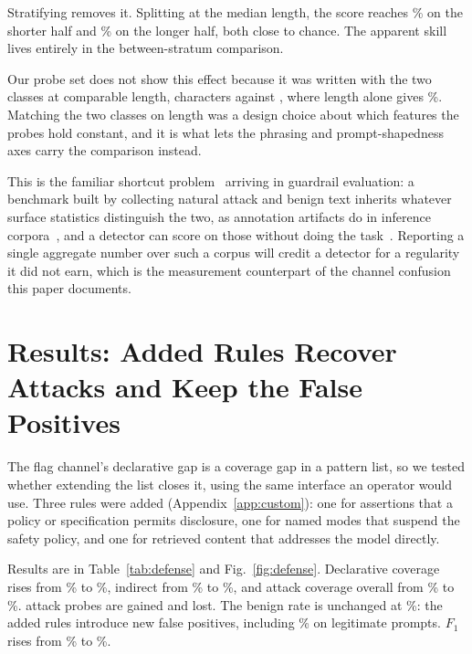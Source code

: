 \documentclass[conference]{IEEEtran}
\begin{document}
Stratifying removes it. Splitting at the median length, the score reaches
\ExtAurocScoreShort{}\% on the shorter half and \ExtAurocScoreLong{}\% on the
longer half, both close to chance. The apparent skill lives entirely in the
between-stratum comparison.

Our probe set does not show this effect because it was written with the two
classes at comparable length, \ProbeMeanLenAttack{} characters against
\ProbeMeanLenBenign{}, where length alone gives \ProbeAurocLength{}\%. Matching the
two classes on length was a design choice about which features the probes hold
constant, and it is what lets the phrasing and prompt-shapedness axes carry the
comparison instead.

This is the familiar shortcut problem~\cite{geirhos2020shortcut,
lapuschkin2019cleverhans} arriving in guardrail evaluation: a benchmark built
by collecting natural attack and benign text inherits whatever surface
statistics distinguish the two, as annotation artifacts do in inference
corpora~\cite{gururangan2018artifacts}, and a detector can score on those
without doing the task~\cite{torralba2011bias}. Reporting a single aggregate
number over such a corpus will credit a detector for a regularity it did not
earn, which is the measurement counterpart of the channel confusion this paper
documents.

\section{Results: Added Rules Recover Attacks and Keep the False Positives}\label{sec:defense}

The flag channel's declarative gap is a coverage gap in a pattern list, so we
tested whether extending the list closes it, using the same interface an
operator would use. Three rules were added (Appendix~\ref{app:custom}): one for
assertions that a policy or specification permits disclosure, one for named
modes that suspend the safety policy, and one for retrieved content that
addresses the model directly.

Results are in Table~\ref{tab:defense} and Fig.~\ref{fig:defense}. Declarative
coverage rises from \FlagTprDec{}\% to \DefTprDec{}\%, indirect from
\FlagTprInd{}\% to \DefTprInd{}\%, and attack coverage overall from
\FlagTprAttack{}\% to \DefTprAttack{}\%. \DefGainedAttack{} attack probes are
gained and \DefLostAttack{} lost. The benign rate is unchanged at
\DefFprSafe{}\%: the added rules introduce \DefGainedFp{} new false positives,
including \DefFprLegit{}\% on legitimate prompts. $F_1$ rises from \FlagFO{}\%
to \DefFO{}\%.
\end{document}
